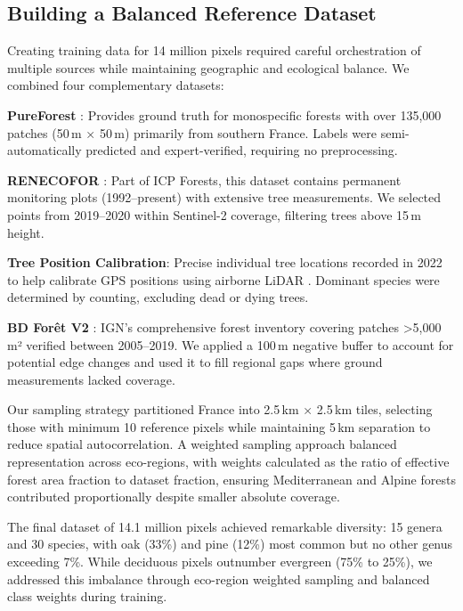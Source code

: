 \subsection{Building a Balanced Reference Dataset}

Creating training data for 14 million pixels required careful orchestration of multiple sources while maintaining geographic and ecological balance. We combined four complementary datasets:

\textbf{PureForest} \citep{gaydon2024pureforestlargescaleaeriallidar}: Provides ground truth for monospecific forests with over 135,000 patches (50\,m × 50\,m) primarily from southern France. Labels were semi-automatically predicted and expert-verified, requiring no preprocessing.

\textbf{RENECOFOR} \citep{ulrich:hal-03444393}: Part of ICP Forests, this dataset contains permanent monitoring plots (1992–present) with extensive tree measurements. We selected points from 2019–2020 within Sentinel-2 coverage, filtering trees above 15\,m height.

\textbf{Tree Position Calibration}: Precise individual tree locations recorded in 2022 to help \citep{ONF} calibrate GPS positions using airborne LiDAR \citep{IGN_LiDARHD}. Dominant species were determined by counting, excluding dead or dying trees.

\textbf{BD Forêt V2} \citep{IGN2024}: IGN's comprehensive forest inventory covering patches >5,000\,m² verified between 2005–2019. We applied a 100\,m negative buffer to account for potential edge changes and used it to fill regional gaps where ground measurements lacked coverage.

Our sampling strategy partitioned France into 2.5\,km × 2.5\,km tiles, selecting those with minimum 10 reference pixels while maintaining 5\,km separation to reduce spatial autocorrelation. A weighted sampling approach balanced representation across eco-regions, with weights calculated as the ratio of effective forest area fraction to dataset fraction, ensuring Mediterranean and Alpine forests contributed proportionally despite smaller absolute coverage.

The final dataset of 14.1 million pixels achieved remarkable diversity: 15 genera and 30 species, with oak (33\%) and pine (12\%) most common but no other genus exceeding 7\%. While deciduous pixels outnumber evergreen (75\% to 25\%), we addressed this imbalance through eco-region weighted sampling and balanced class weights during training.